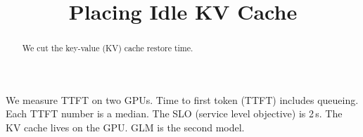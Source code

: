 \documentclass{article}
\title{Placing Idle KV Cache}
\begin{document}
\maketitle
\begin{abstract}
We cut the key-value (KV) cache restore time.
\end{abstract}
We measure TTFT on two GPUs.
Time to first token (TTFT) includes queueing.
Each TTFT number is a median.
The SLO (service level objective) is 2\,s.
The KV cache lives on the GPU.
GLM is the second model.
\end{document}
